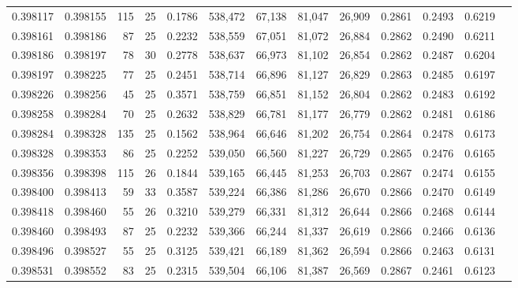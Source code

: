 \begin{tabular}{rrrrrrrrrrrrr}
0.398117 & 0.398155 &   115 &  25 &                                     0.1786 & 538,472 &  67,138 &  81,047 &  26,909 & 0.2861 & 0.2493 & 0.6219 \\
0.398161 & 0.398186 &    87 &  25 &                                     0.2232 & 538,559 &  67,051 &  81,072 &  26,884 & 0.2862 & 0.2490 & 0.6211 \\
0.398186 & 0.398197 &    78 &  30 &                                     0.2778 & 538,637 &  66,973 &  81,102 &  26,854 & 0.2862 & 0.2487 & 0.6204 \\
0.398197 & 0.398225 &    77 &  25 &                                     0.2451 & 538,714 &  66,896 &  81,127 &  26,829 & 0.2863 & 0.2485 & 0.6197 \\
0.398226 & 0.398256 &    45 &  25 &                                     0.3571 & 538,759 &  66,851 &  81,152 &  26,804 & 0.2862 & 0.2483 & 0.6192 \\
0.398258 & 0.398284 &    70 &  25 &                                     0.2632 & 538,829 &  66,781 &  81,177 &  26,779 & 0.2862 & 0.2481 & 0.6186 \\
0.398284 & 0.398328 &   135 &  25 &                                     0.1562 & 538,964 &  66,646 &  81,202 &  26,754 & 0.2864 & 0.2478 & 0.6173 \\
0.398328 & 0.398353 &    86 &  25 &                                     0.2252 & 539,050 &  66,560 &  81,227 &  26,729 & 0.2865 & 0.2476 & 0.6165 \\
0.398356 & 0.398398 &   115 &  26 &                                     0.1844 & 539,165 &  66,445 &  81,253 &  26,703 & 0.2867 & 0.2474 & 0.6155 \\
0.398400 & 0.398413 &    59 &  33 &                                     0.3587 & 539,224 &  66,386 &  81,286 &  26,670 & 0.2866 & 0.2470 & 0.6149 \\
0.398418 & 0.398460 &    55 &  26 &                                     0.3210 & 539,279 &  66,331 &  81,312 &  26,644 & 0.2866 & 0.2468 & 0.6144 \\
0.398460 & 0.398493 &    87 &  25 &                                     0.2232 & 539,366 &  66,244 &  81,337 &  26,619 & 0.2866 & 0.2466 & 0.6136 \\
0.398496 & 0.398527 &    55 &  25 &                                     0.3125 & 539,421 &  66,189 &  81,362 &  26,594 & 0.2866 & 0.2463 & 0.6131 \\
0.398531 & 0.398552 &    83 &  25 &                                     0.2315 & 539,504 &  66,106 &  81,387 &  26,569 & 0.2867 & 0.2461 & 0.6123 \\

\end{tabular}
